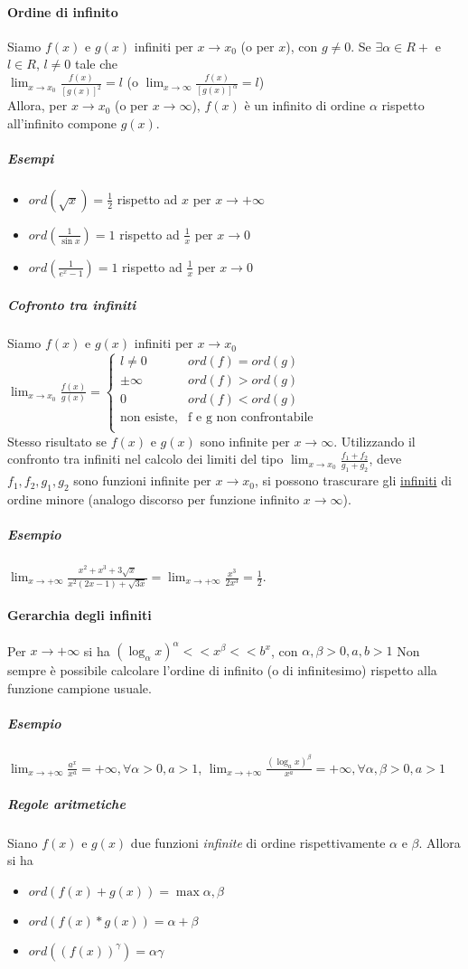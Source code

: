 \documentclass{book}
\begin{document}
\paragraph{Ordine di infinito}
Siamo $f(x)$ e $g(x)$ infiniti per $x\to x_0$ (o per $x$), con $g\neq 0$. Se $\exists\alpha\in R+$ e $l\in R$, $l\neq 0$ tale che\\
$\lim_{x\to x_0}\frac{f(x)}{[g(x)]^2}=l$ (o $\lim_{x\to \infty}\frac{f(x)}{[g(x)]^\alpha}=l$)\\
Allora, per $x\to x_0$ (o per $x\to \infty$), $f(x)$ è un infinito di ordine $\alpha$ rispetto all'infinito compone $g(x)$.
\subparagraph{Esempi}
\begin{itemize}
	\item $ord(\sqrt{x})=\frac{1}{2}$ rispetto ad $x$ per $x\to +\infty$
	\item $ord(\frac{1}{\sin x})=1$ rispetto ad $\frac{1}{x}$ per $x\to 0$
	\item $ord(\frac{1}{e^x-1})=1$ rispetto ad $\frac{1}{x}$ per $x\to 0$
\end{itemize}
\subparagraph{Cofronto tra infiniti}
Siamo $f(x)$ e $g(x)$ infiniti per $x\to x_0$\\
$\lim_{x\to x_0}\frac{f(x)}{g(x)}=\begin{cases}
l\neq 0&ord(f)=ord(g)\\
\pm \infty&ord(f)>ord(g)\\
0&ord(f)<ord(g)\\
	\text{non esiste,} & \text{f e g non confrontabile} \\ 
\end{cases}
$\\
Stesso risultato se $f(x)$ e $g(x)$ sono infinite per $x \to \infty$. Utilizzando il confronto tra infiniti nel calcolo dei limiti del tipo $\lim_{x\to x_0}\frac{f_1+f_2}{g_1+g_2}$, deve $f_1,f_2,g_1,g_2$ sono funzioni infinite per $x\to x_0$, si possono {\color{red}trascurare gli \underline{infiniti} di ordine minore} (analogo discorso per funzione infinito $x\to \infty$).
\subparagraph{Esempio}
$\lim_{x\to +\infty}\frac{x^2+x^3+3\sqrt{x}}{x^2(2x-1)+\sqrt{3x}}=\lim_{x\to +\infty}\frac{x^3}{2x^3}=\frac{1}{2}$.
\paragraph{Gerarchia degli infiniti}
Per $x\to +\infty$ si ha $(\log_\alpha x)^\alpha<<x^\beta<<b^x$, con $\alpha,\beta>0,a,b>1$ Non sempre è possibile calcolare l'ordine di infinito (o di infinitesimo) rispetto alla funzione campione usuale.\\
\subparagraph{Esempio}
$\lim_{x\to +\infty}\frac{a^x}{x^a}=+\infty, \forall \alpha>0, a>1$, $\lim_{x\to +\infty}\frac{(\log_a x)^\beta}{x^a}=+\infty, \forall \alpha, \beta>0, a>1$
\subparagraph{Regole aritmetiche}
Siano $f(x)$ e $g(x)$ due funzioni \emph{infinite} di ordine rispettivamente $\alpha$ e $\beta$. Allora si ha
\begin{itemize}
	\item $ord(f(x)+g(x))=\max{\alpha,\beta}$
	\item $ord(f(x)*g(x))=\alpha+\beta$
	\item $ord((f(x))^\gamma)=\alpha\gamma$
\end{itemize}
\end{document}
